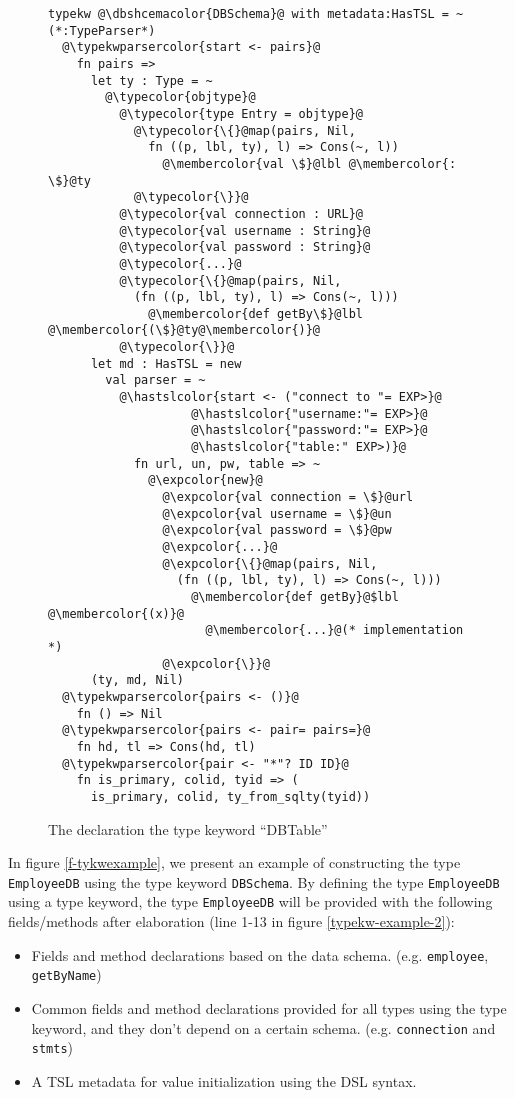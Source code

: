 \documentclass{sig-alternate}
\newcommand{\typekwparsercolor}[1]{\textcolor[HTML]{7C803E}{#1}}
\newcommand{\expcolor}[1]{\textcolor[HTML]{FF0033}{#1}}
\newcommand{\membercolor}[1]{\textcolor[HTML]{FF6600}{#1}}
\newcommand{\typecolor}[1]{\textcolor[HTML]{660066}{#1}}
\newcommand{\hastslcolor}[1]{\textcolor[HTML]{002FC9}{#1}}
\newcommand{\dbshcemacolor}[1]{\textcolor[HTML]{5AC3D1}{#1}}
\newcommand{\mycaption}[1]{\vspace{-4px}\caption{#1}\vspace{-2px}}
\begin{document}
\begin{figure}[ht]
\begin{lstlisting}[style=wyvern]
typekw @\dbshcemacolor{DBSchema}@ with metadata:HasTSL = ~ (*:TypeParser*)
  @\typekwparsercolor{start <- pairs}@
    fn pairs =>
      let ty : Type = ~
        @\typecolor{objtype}@
          @\typecolor{type Entry = objtype}@
            @\typecolor{\{}@map(pairs, Nil, 
              fn ((p, lbl, ty), l) => Cons(~, l))
                @\membercolor{val \$}@lbl @\membercolor{:  \$}@ty
            @\typecolor{\}}@
          @\typecolor{val connection : URL}@
          @\typecolor{val username : String}@
          @\typecolor{val password : String}@
          @\typecolor{...}@
          @\typecolor{\{}@map(pairs, Nil, 
            (fn ((p, lbl, ty), l) => Cons(~, l)))
              @\membercolor{def getBy\$}@lbl @\membercolor{(\$}@ty@\membercolor{)}@
          @\typecolor{\}}@
      let md : HasTSL = new 
        val parser = ~
          @\hastslcolor{start <- ("connect to "= EXP>}@
                    @\hastslcolor{"username:"= EXP>}@
                    @\hastslcolor{"password:"= EXP>}@
                    @\hastslcolor{"table:" EXP>)}@
            fn url, un, pw, table => ~
              @\expcolor{new}@ 
                @\expcolor{val connection = \$}@url
                @\expcolor{val username = \$}@un
                @\expcolor{val password = \$}@pw
                @\expcolor{...}@
                @\expcolor{\{}@map(pairs, Nil, 
                  (fn ((p, lbl, ty), l) => Cons(~, l)))
                    @\membercolor{def getBy}@$lbl @\membercolor{(x)}@ 
                      @\membercolor{...}@(* implementation *)
                @\expcolor{\}}@
      (ty, md, Nil)
  @\typekwparsercolor{pairs <- ()}@
    fn () => Nil 
  @\typekwparsercolor{pairs <- pair= pairs=}@
    fn hd, tl => Cons(hd, tl)
  @\typekwparsercolor{pair <- "*"? ID ID}@
    fn is_primary, colid, tyid => (
      is_primary, colid, ty_from_sqlty(tyid))
\end{lstlisting}
\mycaption{The declaration the type keyword ``DBTable''}
\label{typekw-example-1}
\end{figure}

In figure \ref{f-tykwexample}, we present an example of constructing the type \verb|EmployeeDB| using the type keyword \verb|DBSchema|. By defining the type \verb|EmployeeDB| using a type keyword, the type \verb|EmployeeDB| will be provided with the following fields/methods after elaboration (line 1-13 in figure \ref{typekw-example-2}):
\begin{itemize}\setlength{\itemsep}{0pt}
\item Fields and method declarations based on the data schema. (e.g. \verb|employee|, \verb|getByName|)
\item Common fields and method declarations provided for all types using the type keyword, and they don't depend on a certain schema. (e.g. \verb|connection| and \verb|stmts|)
\item A TSL metadata for value initialization using the DSL syntax.
\end{itemize}
\end{document}
